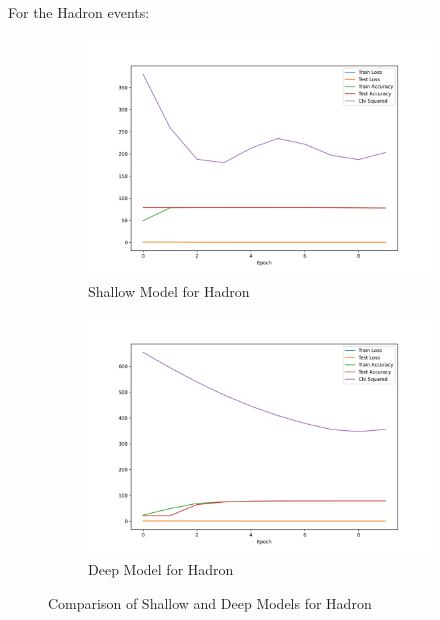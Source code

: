 \documentclass{article}
\begin{document}
For the Hadron events: 
\begin{figure}[H]
    \centering
    \begin{subfigure}[b]{0.45\textwidth}
        \includegraphics[width=\textwidth]{graphs/nn_hadrons_metrics.png}
        \caption{Shallow Model for Hadron}
        \label{fig:accuracy_loss_hadr}
    \end{subfigure}
    \hfill
    \begin{subfigure}[b]{0.45\textwidth}
        \includegraphics[width=\textwidth]{graphs/nn_hadrons_metrics_deeper.png}
        \caption{Deep Model for Hadron}
        \label{fig:accuracy_loss_hadr_deep}
    \end{subfigure}
    \caption{Comparison of Shallow and Deep Models for Hadron}
\end{figure}
\end{document}
